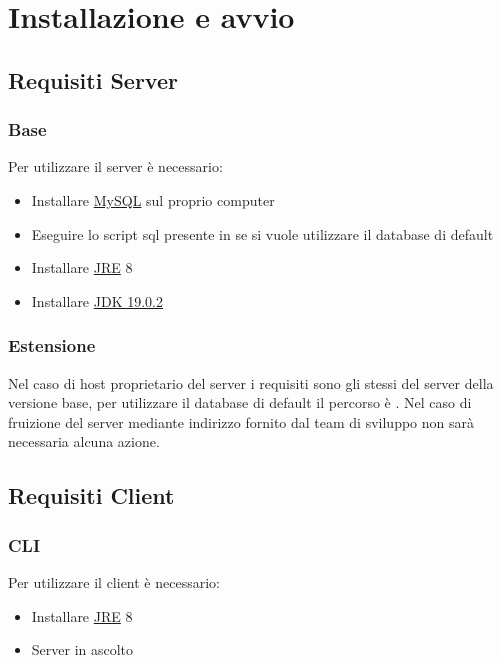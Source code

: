 \section{Installazione e avvio}
\subsection{Requisiti Server}
\subsubsection{Base}
\noindent Per utilizzare il server è necessario:
\begin{itemize}[label=-]
  \item Installare \href{https://dev.mysql.com/downloads/installer/}{MySQL} sul proprio computer
  \item Eseguire lo script sql presente in  se si vuole utilizzare il database di default
  \item Installare \href{https://www.oracle.com/technetwork/java/javase/downloads/jre8-downloads-2133155.html}{JRE} 8
  \item Installare \href{https://www.oracle.com/java/technologies/javase/jdk19-archive-downloads.html}{JDK 19.0.2}
\end{itemize}

\subsubsection{Estensione}
\noindent Nel caso di host proprietario del server i requisiti sono gli stessi del server della versione base, per utilizzare il database di default il percorso è . Nel caso di fruizione del server mediante indirizzo fornito dal team di sviluppo non sarà necessaria alcuna azione.

\subsection{Requisiti Client}
\subsubsection{CLI}
\noindent Per utilizzare il client è necessario:
\begin{itemize}[label=-]
  \item Installare \href{https://www.oracle.com/technetwork/java/javase/downloads/jre8-downloads-2133155.html}{JRE} 8  
  \item Server in ascolto
\end{itemize}

